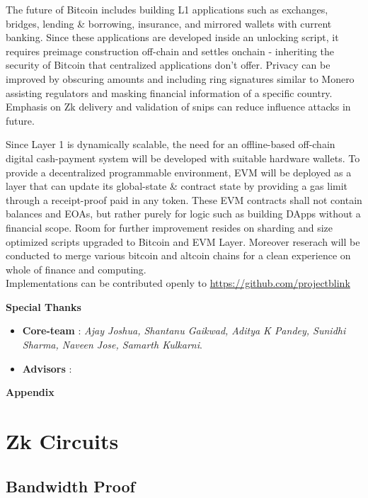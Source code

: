 \documentclass[a4paper,10pt]{article}
\begin{document}
The future of Bitcoin includes building L1 applications such as exchanges, bridges, lending \& borrowing, insurance, and mirrored wallets with current banking. Since these applications are developed inside an unlocking script, it requires preimage construction off-chain and settles onchain - inheriting the security of Bitcoin that centralized applications don't offer. Privacy can be improved by obscuring amounts and including ring signatures similar to Monero assisting regulators and masking financial information of a specific country. Emphasis on Zk delivery and validation of snips can reduce influence attacks in future. 

Since Layer 1 is dynamically scalable, the need for an offline-based off-chain digital cash-payment system will be developed with suitable hardware wallets. To provide a decentralized programmable environment, EVM will be deployed as a layer that can update its global-state \& contract state by providing a gas limit through a receipt-proof paid in any token. These EVM contracts shall not contain balances and EOAs, but rather purely for logic such as building DApps without a financial scope. Room for further improvement resides on sharding and size optimized scripts upgraded to Bitcoin and EVM Layer. Moreover reserach will be conducted to merge various bitcoin and altcoin chains for a clean experience on whole of finance and computing.\\

\noindent Implementations can be contributed openly to \url{https://github.com/projectblink}
\nocite{nakamoto2008bitcoin} \nocite{poon2016bitcoin}  \nocite{yakovenko2018solana} \nocite{wood2014ethereum} \nocite{chainlink}



\noindent \textbf{Special Thanks}
\begin{itemize}
\item \textbf{Core-team} : \textit{Ajay Joshua, Shantanu Gaikwad, Aditya K Pandey, Sunidhi Sharma, Naveen Jose, Samarth Kulkarni}. 
\item \textbf{Advisors} : 
\end{itemize}

\vspace{5mm}
\appendix
\noindent \Large \textbf{Appendix}
\normalsize
\section{Zk Circuits }
\subsection{Bandwidth Proof}
\end{document}
